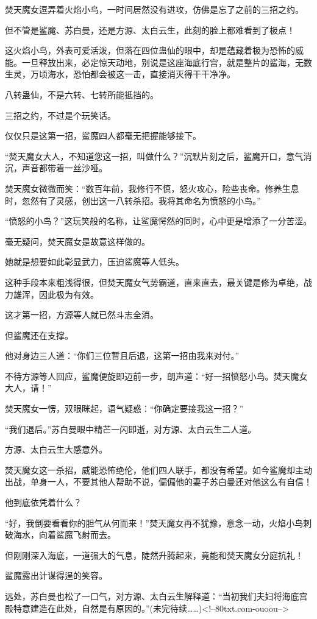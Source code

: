 \begin{this_body}
焚天魔女逗弄着火焰小鸟，一时间居然没有进攻，仿佛是忘了之前的三招之约。

但不管是鲨魔、苏白曼，还是方源、太白云生，此刻的脸上都难看到了极点！

这火焰小鸟，外表可爱活泼，但落在四位蛊仙的眼中，却是蕴藏着极为恐怖的威能。一旦释放出来，必定惊天动地，别说是这座海底行宫，就是整片的鲨海，无数生灵，万顷海水，恐怕都会被这一击，直接消灭得干干净净。

八转蛊仙，不是六转、七转所能抵挡的。

三招之约，不过是个玩笑话。

仅仅只是这第一招，鲨魔四人都毫无把握能够接下。

“焚天魔女大人，不知道您这一招，叫做什么？”沉默片刻之后，鲨魔开口，意气消沉，声音都带着一丝沙哑。

焚天魔女微微而笑：“数百年前，我修行不慎，怒火攻心，险些丧命。修养生息时，忽然有了灵感，创出这一八转杀招。我将其命名为愤怒的小鸟。”

“愤怒的小鸟？”这玩笑般的名称，让鲨魔愕然的同时，心中更是增添了一分苦涩。

毫无疑问，焚天魔女是故意这样做的。

她就是想要如此彰显武力，压迫鲨魔等人低头。

这种手段本来粗浅得很，但焚天魔女气势霸道，直来直去，最关键是修为卓绝，战力雄浑，因此极为有效。

这才第一招，方源等人就已然斗志全消。

但鲨魔还在支撑。

他对身边三人道：“你们三位暂且后退，这第一招由我来对付。”

不待方源等人回应，鲨魔便旋即迈前一步，朗声道：“好一招愤怒小鸟。焚天魔女大人，请！”

焚天魔女一愣，双眼眯起，语气疑惑：“你确定要接我这一招？”

“我们退后。”苏白曼眼中精芒一闪即逝，对方源、太白云生二人道。

方源、太白云生大感意外。

焚天魔女这一杀招，威能恐怖绝伦，他们四人联手，都没有希望。如今鲨魔却主动出战，单身一人，不要其他人帮助不说，偏偏他的妻子苏白曼还对他这么有自信！

他到底依凭着什么？

“好，我倒要看看你的胆气从何而来！”焚天魔女再不犹豫，意念一动，火焰小鸟刺破海水，向着鲨魔飞射而去。

但刚刚深入海底，一道强大的气息，陡然升腾起来，竟能和焚天魔女分庭抗礼！

鲨魔露出计谋得逞的笑容。

远处，苏白曼也松了一口气，对方源、太白云生解释道：“当初我们夫妇将海底宫殿特意建造在此处，自然是有原因的。”(未完待续……)<!--80txt.com-ouoou-->

\end{this_body}

